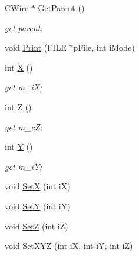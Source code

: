 \begin{DoxyCompactItemize}
\mbox{\hyperlink{classCWire}{C\+Wire}} $\ast$ \mbox{\hyperlink{classCPoint_ac87cc89b531011be9c848630da1343b7}{Get\+Parent}} ()
\begin{DoxyCompactList}\small\item\em get parent. \end{DoxyCompactList}\item 
void \mbox{\hyperlink{classCPoint_a1610463f19b7ff508ed229791dd6335d}{Print}} (F\+I\+LE $\ast$p\+File, int i\+Mode)
\item 
int \mbox{\hyperlink{classCPoint_aeb92159e1d1045ceab79eea735d22af2}{X}} ()
\begin{DoxyCompactList}\small\item\em get m\+\_\+iX; \end{DoxyCompactList}\item 
int \mbox{\hyperlink{classCPoint_a6d03d17763a148af852d10a9a410167e}{Z}} ()
\begin{DoxyCompactList}\small\item\em get m\+\_\+cZ; \end{DoxyCompactList}\item 
int \mbox{\hyperlink{classCPoint_a8543d7ba2b9d1f9ec3373bd8258a66d0}{Y}} ()
\begin{DoxyCompactList}\small\item\em get m\+\_\+iY; \end{DoxyCompactList}\item 
void \mbox{\hyperlink{classCPoint_ac9557dddaefffd4c7cc0a20090ef5324}{SetX}} (int iX)
\item 
void \mbox{\hyperlink{classCPoint_a984d81a6620d3bcf3df8dc14c42f2a1d}{SetY}} (int iY)
\item 
void \mbox{\hyperlink{classCPoint_abc4fb18e1e3ca6545e6f6e4c7cb0e555}{SetZ}} (int iZ)
\item 
void \mbox{\hyperlink{classCPoint_ae8364b4fc6b31f4a844f38a13f2251c7}{Set\+X\+YZ}} (int iX, int iY, int iZ)
\end{DoxyCompactItemize}
